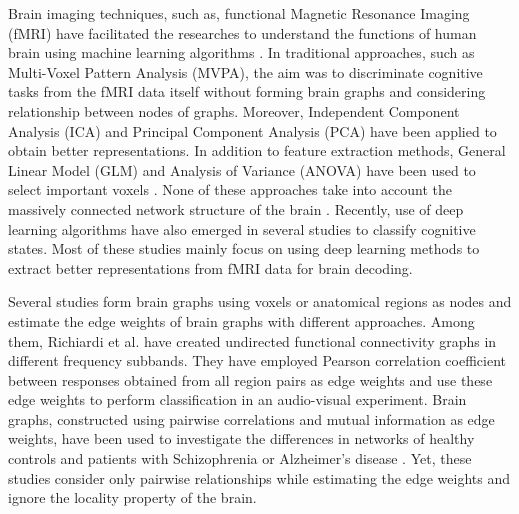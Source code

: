 \documentclass[runningheads]{llncs}
\begin{document}
Brain imaging techniques, such as, functional Magnetic Resonance Imaging (fMRI) have facilitated the researches to understand the functions of human brain using machine learning algorithms \cite{pereira2009machine,mitchell2004learning,wang2004training,michel2012supervised}.
In traditional approaches, such as Multi-Voxel Pattern Analysis (MVPA), the aim was to discriminate cognitive tasks from the fMRI data itself without forming brain graphs and considering relationship between nodes of graphs. Moreover, Independent Component Analysis (ICA) and Principal Component Analysis (PCA) have been applied to obtain better representations. In addition to feature extraction methods, General Linear Model (GLM) and Analysis of Variance (ANOVA) have been used to select important voxels \cite{pereira2009machine}. None of these approaches take into account the massively connected network structure of the brain \cite{zhou2009detecting,smith2014group,calhoun2009review,calhoun2003ica,mckeown1998independent}. 
Recently, use of deep learning algorithms have also emerged in several studies \cite{kawahara2017brainnetcnn,koyamada2015deep,firat2014deep} to classify cognitive states. Most of these studies mainly focus on using deep learning methods to extract better representations from fMRI data for brain decoding.

Several studies form brain graphs using voxels or anatomical regions as nodes and estimate the edge weights of brain graphs with different approaches. Among them, Richiardi et al. \cite{richiardi2011decoding} have created undirected functional connectivity graphs in different frequency subbands. They have employed Pearson correlation coefficient between responses obtained from all region pairs as edge weights and use these edge weights to perform classification in an audio-visual experiment. Brain graphs, constructed using pairwise correlations and mutual information as edge weights, have been used to investigate the differences in networks of healthy controls and patients with Schizophrenia \cite{lynall2010functional} or Alzheimer's disease \cite{menon2011large,kurmukov2017classifying}. Yet, these studies consider only pairwise relationships while estimating the edge weights and ignore the locality property of the brain.
\end{document}
